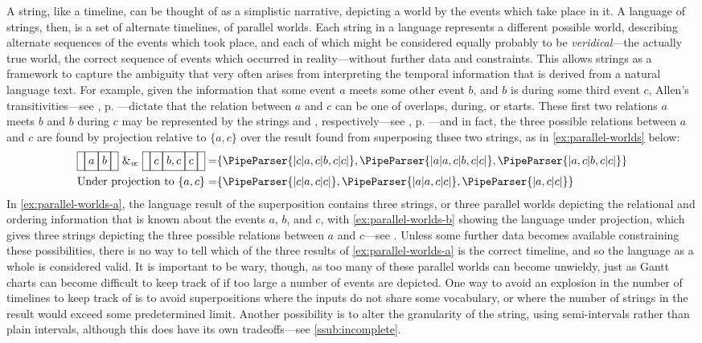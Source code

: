 \documentclass[a4paper,12pt,leqno]{article}
\newcommand{\vph}[1]{\vphantom{#1}}
\newcommand{\ebox}[1]{\fbox{$\vph{'(),}#1$}}
\newcommand{\nbMeets}[2]{\ebox{#1}\ebox{#2}}
\newcommand{\nbDuring}[2]{\ebox{#2}\ebox{#1,#2}\ebox{#2}}
\newcommand{\Meets}[2]{\ebox{}\nbMeets{#1}{#2}\ebox{}}
\newcommand{\During}[2]{\ebox{}\nbDuring{#1}{#2}\ebox{}}
\newcommand{\spvc}{~\&_{v\!c}~}
\newcommand{\EventString}[1]{%
	\renewcommand*{\do}[1]{\ebox{##1}}%
	\PipeParser{#1}%
}
\begin{document}
A string, like a timeline, can be thought of as a simplistic narrative, depicting a world by the events which take place in it. A language of strings, then, is a set of alternate timelines, of parallel worlds. Each string in a language represents a different possible world, describing alternate sequences of the events which took place, and each of which might be considered equally probably to be \textit{veridical}---the actually true world, the correct sequence of events which occurred in reality---without further data and constraints. This allows strings as a framework to capture the ambiguity that very often arises from interpreting the temporal information that is derived from a natural language text. For example, given the information that some event $a$ meets some other event $b$, and $b$ is during some third event $c$, Allen's transitivities---see , p. \pageref{tab:allen-trans-table}---dictate that the relation between $a$ and $c$ can be one of overlaps, during, or starts. These first two relations $a$ meets $b$ and $b$ during $c$ may be represented by the strings \Meets{a}{b} and \During{b}{c}, respectively---see , p. \pageref{tab:allen-rels-strings}---and in fact, the three possible relations between $a$ and $c$ are found by projection relative to $\{a,c\}$ over the result found from superposing thsee two strings, as in \cref{ex:parallel-worlds} below:
\begin{subequations}\label{ex:parallel-worlds}
	\begin{align}
		\Meets{a}{b} \spvc \During{b}{c} = &\{\EventString{{}|c|a,c|b,c|c|{}}, \EventString{{}|a|a,c|b,c|c|{}}, \EventString{{}|a,c|b,c|c|{}}\}\label{ex:parallel-worlds-a}\\
		\text{Under projection to }\{a,c\} = &\{\EventString{{}|c|a,c|c|{}}, \EventString{{}|a|a,c|c|{}}, \EventString{{}|a,c|c|{}}\}\label{ex:parallel-worlds-b}
	\end{align}
\end{subequations}
In \cref{ex:parallel-worlds-a}, the language result of the superposition contains three strings, or three parallel worlds depicting the relational and ordering information that is known about the events $a$, $b$, and $c$, with \cref{ex:parallel-worlds-b} showing the language under projection, which gives three strings depicting the three possible relations between $a$ and $c$---see . Unless some further data becomes available constraining these possibilities, there is no way to tell which of the three results of \cref{ex:parallel-worlds-a} is the correct timeline, and so the language as a whole is considered valid. It is important to be wary, though, as too many of these parallel worlds can become unwieldy, just as Gantt charts can become difficult to keep track of if too large a number of events are depicted. One way to avoid an explosion in the number of timelines to keep track of is to avoid superpositions where the inputs do not share some vocabulary, or where the number of strings in the result would exceed some predetermined limit. Another possibility is to alter the granularity of the string, using semi-intervals \citep{Freksa1992} rather than plain intervals, although this does have its own tradeoffs---see \cref{ssub:incomplete}.
\end{document}
